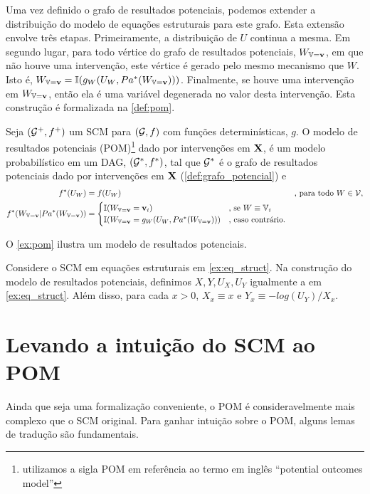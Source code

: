 Uma vez definido o grafo de resultados potenciais,
podemos extender a distribuição
do modelo de equações estruturais para este grafo.
Esta extensão envolve três etapas.
Primeiramente, a distribuição de $U$ continua a mesma.
Em segundo lugar, para todo 
vértice do grafo de resultados potenciais, $W_{{\mathbb V}={\mathbf{v}}}$, 
em que não houve uma intervenção, 
este vértice é gerado pelo mesmo mecanismo que $W$.
Isto é, $W_{{\mathbb V}={\mathbf{v}}} = {\mathbb I}(g_W(U_W, Pa^*(W_{{\mathbb V}={\mathbf{v}}})))$.
Finalmente, se houve uma intervenção em $W_{{\mathbb V}={\mathbf{v}}}$,
então ela é uma variável degenerada no valor desta intervenção.
Esta construção é formalizada na \cref{def:pom}.

\begin{definition}
 \label{def:pom}
 Seja $({\mathcal G}^+, f^+)$ um
 SCM para $({\mathcal G}, f)$
 com funções determinísticas, $g$.
 O modelo de resultados potenciais (POM)\footnote{
  utilizamos a sigla POM em referência ao
  termo em inglês ``potential outcomes model''} 
  dado por intervenções em ${\mathbf{X}}$,
 é um modelo probabilístico em um DAG, $({\mathcal G}^*, f^*)$, tal que
 ${\mathcal G}^*$ é o grafo de resultados potenciais
 dado por intervenções em ${\mathbf{X}}$ (\cref{def:grafo_potencial}) e
 \begin{align*}
  f^*(U_W) &= f(U_W) & \text{, para todo } W \in {\mathcal V}, \\
  f^*(W_{{\mathbb V}={\mathbf{v}}}|Pa^*(W_{{\mathbb V}={\mathbf{v}}}))
  &= 
  \begin{cases}
   {\mathbb I}(W_{{\mathbb V}={\mathbf{v}}} = {\mathbf{v}}_i) & \text{, se } W \equiv {\mathbb V}_i \\
   {\mathbb I}(W_{{\mathbb V}={\mathbf{v}}} = g_W(U_W, Pa^*(W_{{\mathbb V}={\mathbf{v}}}))) & \text{, caso contrário.}
  \end{cases}
 \end{align*}
\end{definition}

O \cref{ex:pom} ilustra 
um modelo de resultados potenciais.

\begin{example}
 \label{ex:pom}
 Considere o SCM em equações estruturais em \cref{ex:eq_struct}.
 Na construção do modelo de resultados potenciais,
 definimos $X, Y, U_X, U_Y$ igualmente a em \cref{ex:eq_struct}.
 Além disso, para cada $x > 0$,
 $X_{x} \equiv x$ e $Y_x \equiv -log(U_Y)/X_x$.
\end{example}

\section{Levando a intuição do SCM ao POM}
\label{sec:trad_scm_pom}

Ainda que seja uma formalização conveniente,
o POM é consideravelmente mais complexo que o SCM original.
Para ganhar intuição sobre o POM,
alguns lemas de tradução são fundamentais.

